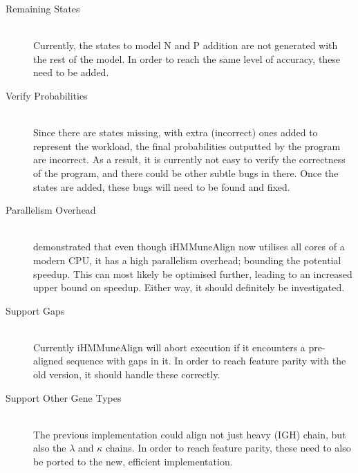 \begin{description}
    \item[Remaining States] \hfill \\
    Currently, the states to model N and P addition are not generated with the rest of the model. In order to reach the same level of accuracy, these need to be added.
    \item[Verify Probabilities] \hfill \\
    Since there are states missing, with extra (incorrect) ones added to represent the workload, the final probabilities outputted by the program are incorrect.
    As a result, it is currently not easy to verify the correctness of the program, and there could be other subtle bugs in there. Once the states are added, these bugs will need to be found and fixed.
    \item[Parallelism Overhead] \hfill \\
     demonstrated that even though iHMMuneAlign now utilises all cores of a modern CPU, it has a high parallelism overhead; bounding the potential speedup.     
    This can most likely be optimised further, leading to an increased upper bound on speedup. Either way, it should definitely be investigated.
    \item[Support Gaps] \hfill \\
    Currently iHMMuneAlign will abort execution if it encounters a pre-aligned sequence with gaps in it. In order to reach feature parity with the old version, it should handle these correctly.
    \item[Support Other Gene Types] \hfill \\
    The previous implementation could align not just heavy (IGH) chain, but also the $\lambda$ and $\kappa$ chains. In order to reach feature parity, these need to also be ported to the new, efficient implementation.
\end{description}